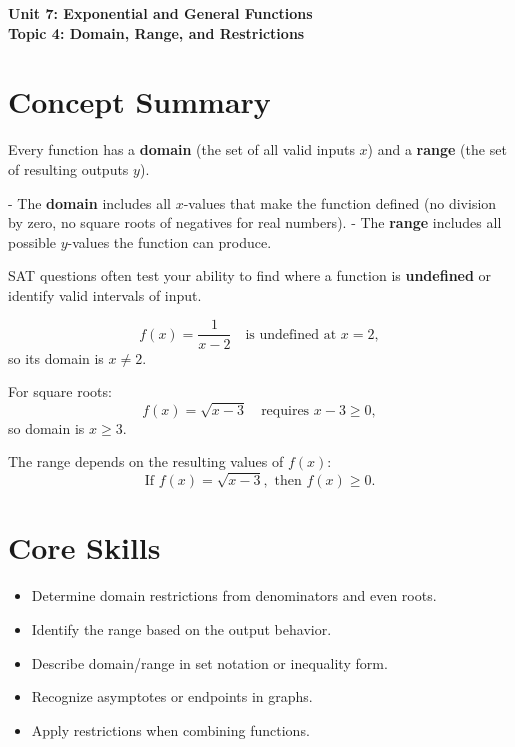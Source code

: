 \documentclass[14pt]{extarticle}
\renewcommand{\emph}[1]{\textbf{#1}}
\begin{document}
\raggedright
{}

\begin{center}
    \LARGE \textbf{Unit 7: Exponential and General Functions} \\[6pt]
    \Large \textbf{Topic 4: Domain, Range, and Restrictions}
\end{center}

\vspace{1em}

\section*{Concept Summary}

Every function has a \textbf{domain} (the set of all valid inputs \(x\)) and a \textbf{range} (the set of resulting outputs \(y\)).

- The \textbf{domain} includes all \(x\)-values that make the function defined (no division by zero, no square roots of negatives for real numbers).
- The \textbf{range} includes all possible \(y\)-values the function can produce.

SAT questions often test your ability to find where a function is \emph{undefined} or identify valid intervals of input.

\[
f(x) = \frac{1}{x - 2} \quad \text{is undefined at } x = 2,
\]
so its domain is \(x \neq 2.\)

For square roots:
\[
f(x) = \sqrt{x - 3} \quad \text{requires } x - 3 \ge 0,
\]
so domain is \(x \ge 3.\)

The range depends on the resulting values of \(f(x)\):
\[
\text{If } f(x) = \sqrt{x - 3}, \text{ then } f(x) \ge 0.
\]

\section*{Core Skills}
\begin{itemize}
  \item Determine domain restrictions from denominators and even roots.
  \item Identify the range based on the output behavior.
  \item Describe domain/range in set notation or inequality form.
  \item Recognize asymptotes or endpoints in graphs.
  \item Apply restrictions when combining functions.
\end{itemize}
\end{document}
